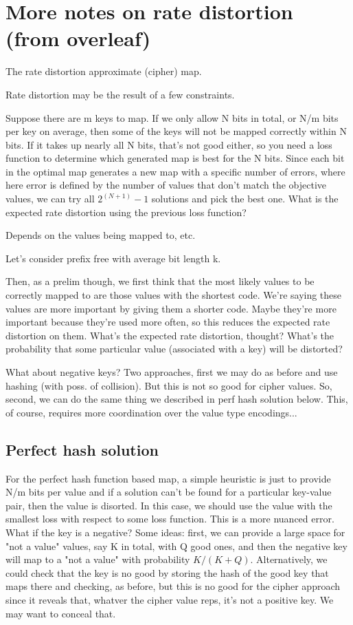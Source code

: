 \documentclass[ ../main.tex]{subfiles}
\begin{document}
\section{More notes on rate distortion (from overleaf)}
The rate distortion approximate (cipher) map.

Rate distortion may be the result of a few constraints.

Suppose there are m keys to map. If we only allow N bits in total, or N/m bits per key on average, then some of the keys will not be mapped correctly within N bits. If it takes up nearly all N bits, that's not good either, so you need a loss function to determine which generated map is best for the N bits.
Since each bit in the optimal map generates a new map with a specific number of errors, where here error is defined by the number of values that don't match the objective values, we can try all $2^(N+1)-1$ solutions and pick the best one. What is the expected rate distortion using the previous loss function?

Depends on the values being mapped to, etc.

Let's consider prefix free with average bit length k.

Then, as a prelim though, we first think that the most likely values to be correctly mapped to are those values with the shortest code. We're saying these values are more important by giving them a shorter code. Maybe they're more important because they're used more often, so this reduces the expected rate distortion on them. What's the expected rate distortion, thought? What's the probability that some particular value (associated with a key) will be distorted?

What about negative keys? Two approaches, first we may do as before and use hashing (with poss. of collision). But this is not so good for cipher values. So, second, we can do the same thing we described in perf hash solution below. This, of course, requires more coordination over the value type encodings...

\subsection{Perfect hash solution}

For the perfect hash function based map, a simple heuristic is just to provide N/m bits per value and if a solution can't be found for a particular key-value pair, then the value is disorted. In this case, we should use the value with the smallest loss with respect to some loss function. This is a more nuanced error. What if the key is a negative? Some ideas: first, we can provide a large space for "not a value" values, say K in total, with Q good ones, and then the negative key will map to a "not a value" with probability $K/(K+Q)$. Alternatively, we could check that the key is no good by storing the hash of the good key that maps there and checking, as before, but this is no good for the cipher approach since it reveals that, whatver the cipher value reps, it's not a positive key. We may want to conceal that. 
\end{document}
